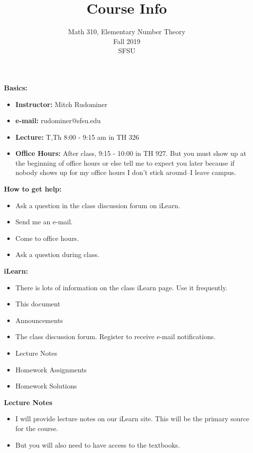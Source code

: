 \documentclass[oneside,12pt]{amsart}
\begin{document}
\title{Course Info}
\author{Math 310, Elementary Number Theory  \\ Fall 2019 \\ SFSU }
\date{}

\maketitle

\textbf{Basics:}
\begin{itemize}
\item \textbf{Instructor:} Mitch Rudominer
\item \textbf{e-mail:} rudominer@sfsu.edu
\item \textbf{Lecture:}  T,Th 8:00 - 9:15 am in TH 326
\item \textbf{Office Hours:} After class, 9:15 - 10:00 in TH 927. But you must show up at the beginning of office hours or else tell me to expect you later because if nobody shows up for my office hours I don't stick around--I leave campus.
\end{itemize}

\bigskip

\textbf{How to get help:}
\begin{itemize}
\item Ask a question in the class discussion forum on iLearn.
\item Send me an e-mail.
\item Come to office hours.
\item Ask a question during class. 
\end{itemize}

\bigskip

\textbf{iLearn:}
\begin{itemize}
\item There is lots of information on the class iLearn page. Use it frequently.
\item This document
\item Announcements
\item The class discussion forum. Register to receive e-mail notifications.
\item Lecture Notes
\item Homework Assignments
\item Homework Solutions
\end{itemize}

\bigskip

\textbf{Lecture Notes} 
\begin{itemize}
\item I will provide lecture notes on our iLearn site. This will be the primary source for the course.
\item But you will also need to have access to the textbooks.
\end{itemize}
\end{document}
